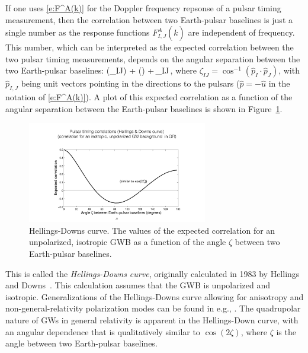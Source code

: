 If one uses \eqref{e:F^A(k)} for the Doppler frequency
repsonse of a pulsar timing measurement, then the correlation
between two Earth-pulsar baselines is just a single number as 
the response functions $F^A_{I,J}(\hat k)$ are independent of
frequency.
This number, which can be interpreted as the expected
correlation between the two pulsar timing measurements, 
depends on the angular separation between the two 
Earth-pulsar baselines:
%
\be
\chi(\zeta_{IJ})\equiv
{} + \left(\right)
+\,\delta_{IJ}\,,
\label{e:HD}
\ee
%
where $\zeta_{IJ} = \cos^{-1}(\hat p_I\cdot\hat p_J)$, with 
$\hat p_{I,J}$ being unit vectors pointing in the directions
to the pulsars ($\hat p=-\hat u$ in the notation 
of \eqref{e:F^A(k)}).
A plot of this expected correlation as a function of the 
angular separation between the Earth-pulsar baselines is
shown in Figure~\ref{f:HD_curve}.
%
\begin{figure}[htbp!]
\begin{center}
\includegraphics[width=0.7\textwidth]{Figures/HD_curve}
\caption{Hellings-Downs curve.
The values of the expected correlation for an unpolarized,
isotropic GWB as a function of the angle $\zeta$ between
two Earth-pulsar baselines.}
\label{f:HD_curve}
\end{center}
\end{figure}
%
This is called the {\em Hellings-Downs curve}, originally 
calculated in 1983 by Hellings and Downs~\cite{Hellings-Downs:1983}.
This calculation assumes that the GWB is unpolarized
and isotropic.
Generalizations of the Hellings-Downs curve allowing for 
anisotropy and non-general-relativity polarization modes
can be found in e.g., \cite{Mingarelli-et-al, Lee-et-al}.
The quadrupolar nature of GWs in general relativity is
apparent in the Hellings-Down curve, with an angular dependence
that is qualitatively similar to $\cos(2\zeta)$, where 
$\zeta$ is the angle between two Earth-pulsar baselines.

